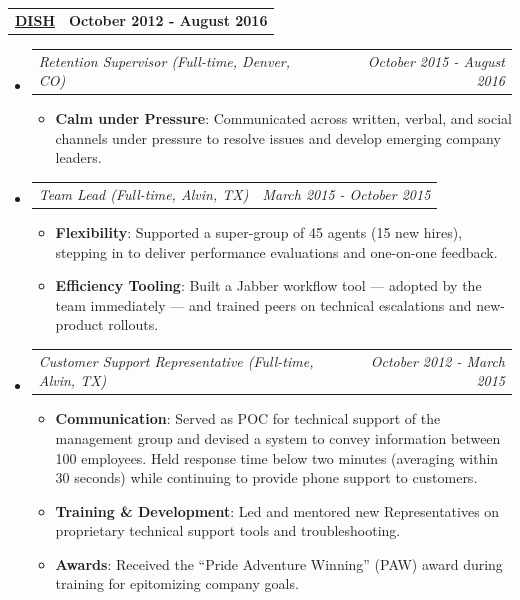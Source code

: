 \documentclass[letterpaper,10.8pt]{article}
\makeatletter
\newcommand{\resumeItem}[2]{
  \item\small{
    \textbf{#1}{: #2 \vspace{-2pt}}
  }
}
\newcommand{\jobLineItem}[2]{
  \vspace{0pt}\item[]
    \begin{tabular*}{0.98\textwidth}{l@{\extracolsep{\fill}}r}
      \textit{#1} & \textit{\small #2} \\
    \end{tabular*}\vspace{-4pt}
}
\newcommand{\employerTitle}[3]{
  \begin{tabular*}{1\textwidth}{l@{\extracolsep{\fill}}r}
    \href{#1}{\textbf{#2}} & \textbf{#3} \\
  \end{tabular*}\vspace{-4pt}
}
\newcommand{\resumeSubHeadingListStart}{\begin{itemize}[leftmargin=*]}
\newcommand{\resumeSubHeadingListEnd}{\end{itemize}}
\newcommand{\resumeItemListStart}{\begin{itemize}}
\newcommand{\resumeItemListEnd}{\end{itemize}\vspace{-5pt}}
\makeatother
\begin{document}
  \employerTitle
    {https://www.dish.com}{DISH}{October 2012 - August 2016}
  \resumeSubHeadingListStart
    \jobLineItem
      {Retention Supervisor (Full-time, Denver, CO)}{October 2015 - August 2016}
      \resumeItemListStart
        \resumeItem{Calm under Pressure}{Communicated across written, verbal, and social channels under pressure to resolve issues and develop emerging company leaders.}
      \resumeItemListEnd
    \jobLineItem
      {Team Lead (Full-time, Alvin, TX)}{March 2015 - October 2015}
      \resumeItemListStart
        \resumeItem{Flexibility}{Supported a super-group of 45 agents (15 new hires), stepping in to deliver performance evaluations and one-on-one feedback.}
        \resumeItem{Efficiency Tooling}{Built a Jabber workflow tool --- adopted by the team immediately --- and trained peers on technical escalations and new-product rollouts.}
      \resumeItemListEnd
    \jobLineItem
      {Customer Support Representative (Full-time, Alvin, TX)}{October 2012 - March 2015}
      \resumeItemListStart
        \resumeItem{Communication}{Served as POC for technical support of the management group and devised a system to convey information between 100 employees. Held response time below two minutes (averaging within 30 seconds) while continuing to provide phone support to customers.}
        \resumeItem{Training \& Development}{Led and mentored new Representatives on proprietary technical support tools and troubleshooting.}
        \resumeItem{Awards}{Received the ``Pride Adventure Winning'' (PAW) award during training for epitomizing company goals.}
      \resumeItemListEnd
  \resumeSubHeadingListEnd



\end{document}
